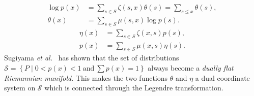 \documentclass[letterpaper]{article} %
\begin{document}
		\begin{equation}
			\begin{split}
				\log p \left( x \right) &= \sum_{s \in S} \zeta \left( s, x \right) \theta \left( s \right) = \sum_{s \le x} \theta \left( s \right), \\
				\theta \left( x \right) &= \sum_{s \in S} \mu \left( s, x \right) \log p \left( s \right). \label{eqn:log_linear_theta}
			\end{split}
		\end{equation}
		\begin{equation}
			\begin{split}
				\eta \left( x \right) &= \sum_{s \in S} \zeta \left( x, s \right) p \left( s \right), \\
				p \left( x \right) &= \sum_{s \in S} \mu \left( x, s \right) \eta \left( s \right). \label{eqn:log_linear_etas}
			\end{split}
		\end{equation}
		Sugiyama \textit{et al.}~\cite{sugiyama2017tensor} has shown that the set of distributions $\mathcal{S} = \left\{ P \mid 0 < p \left( x \right) < 1\ \mathrm{and}\ \sum p \left( x \right) = 1 \right\}$ always become a \textit{dually flat Riemannian manifold}. This makes the two functions $\theta$ and $\eta$ a dual coordinate system on $\mathcal{S}$ which is connected through the Legendre transformation.
\end{document}
